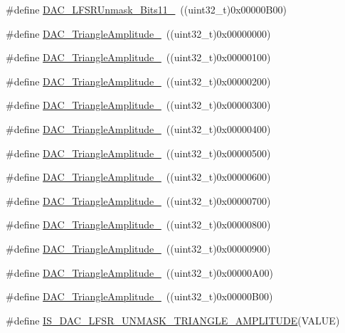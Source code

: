 \begin{DoxyCompactItemize}
\item 
\#define \hyperlink{group___d_a_c__lfsrunmask__triangleamplitude_gaeb9b5992b771f9a14587eeda58227831}{D\+A\+C\+\_\+\+L\+F\+S\+R\+Unmask\+\_\+\+Bits11\+\_}~((uint32\+\_\+t)0x00000\+B00)
\item 
\#define \hyperlink{group___d_a_c__lfsrunmask__triangleamplitude_ga49b1eddf4e6371b4be8751162dc94ac4}{D\+A\+C\+\_\+\+Triangle\+Amplitude\+\_}~((uint32\+\_\+t)0x00000000)
\item 
\#define \hyperlink{group___d_a_c__lfsrunmask__triangleamplitude_ga9798d68c3bbf0a57306bf2f962697377}{D\+A\+C\+\_\+\+Triangle\+Amplitude\+\_}~((uint32\+\_\+t)0x00000100)
\item 
\#define \hyperlink{group___d_a_c__lfsrunmask__triangleamplitude_gad3f31de1277836df1109576a53c47e87}{D\+A\+C\+\_\+\+Triangle\+Amplitude\+\_}~((uint32\+\_\+t)0x00000200)
\item 
\#define \hyperlink{group___d_a_c__lfsrunmask__triangleamplitude_ga42653712ce783d33ecb2f3e97e9c2ece}{D\+A\+C\+\_\+\+Triangle\+Amplitude\+\_}~((uint32\+\_\+t)0x00000300)
\item 
\#define \hyperlink{group___d_a_c__lfsrunmask__triangleamplitude_ga10b15745b749c62a56bd3d7bd5a27e1b}{D\+A\+C\+\_\+\+Triangle\+Amplitude\+\_}~((uint32\+\_\+t)0x00000400)
\item 
\#define \hyperlink{group___d_a_c__lfsrunmask__triangleamplitude_gaaae92dae9c4da55e29c645396825e36b}{D\+A\+C\+\_\+\+Triangle\+Amplitude\+\_}~((uint32\+\_\+t)0x00000500)
\item 
\#define \hyperlink{group___d_a_c__lfsrunmask__triangleamplitude_gaacec0af3f69db46f8984be3af9ecadfb}{D\+A\+C\+\_\+\+Triangle\+Amplitude\+\_}~((uint32\+\_\+t)0x00000600)
\item 
\#define \hyperlink{group___d_a_c__lfsrunmask__triangleamplitude_gadb404422c86a7b92d78e6d9617e8ce4d}{D\+A\+C\+\_\+\+Triangle\+Amplitude\+\_}~((uint32\+\_\+t)0x00000700)
\item 
\#define \hyperlink{group___d_a_c__lfsrunmask__triangleamplitude_ga565b0c97bbdf152756617d491bf8ef85}{D\+A\+C\+\_\+\+Triangle\+Amplitude\+\_}~((uint32\+\_\+t)0x00000800)
\item 
\#define \hyperlink{group___d_a_c__lfsrunmask__triangleamplitude_ga7d573b0cebb1b939bd83367effb93d89}{D\+A\+C\+\_\+\+Triangle\+Amplitude\+\_}~((uint32\+\_\+t)0x00000900)
\item 
\#define \hyperlink{group___d_a_c__lfsrunmask__triangleamplitude_gad33d28d7fcc09d84500ea9b6e6c5feed}{D\+A\+C\+\_\+\+Triangle\+Amplitude\+\_}~((uint32\+\_\+t)0x00000\+A00)
\item 
\#define \hyperlink{group___d_a_c__lfsrunmask__triangleamplitude_ga3ce69f5a63a2464dc4b5f73cb6fe72f5}{D\+A\+C\+\_\+\+Triangle\+Amplitude\+\_}~((uint32\+\_\+t)0x00000\+B00)
\item 
\#define \hyperlink{group___d_a_c__lfsrunmask__triangleamplitude_ga20f7c3c43f917f14593f0c478c2412e1}{I\+S\+\_\+\+D\+A\+C\+\_\+\+L\+F\+S\+R\+\_\+\+U\+N\+M\+A\+S\+K\+\_\+\+T\+R\+I\+A\+N\+G\+L\+E\+\_\+\+A\+M\+P\+L\+I\+T\+U\+DE}(V\+A\+L\+UE)
\end{DoxyCompactItemize}


